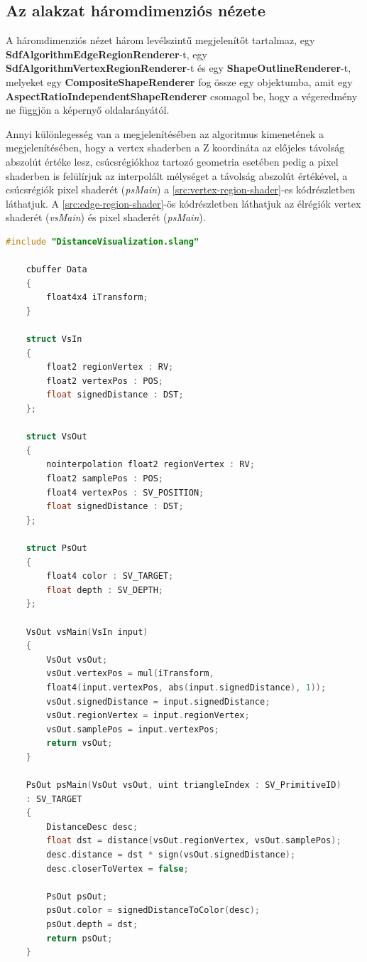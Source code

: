 \subsection{Az alakzat háromdimenziós nézete}

A háromdimenziós nézet három levélszintű megjelenítőt tartalmaz, egy \textbf{SdfAlgorithmEdgeRegionRenderer}-t, egy \textbf{SdfAlgorithmVertexRegionRenderer}-t és egy \textbf{ShapeOutlineRenderer}-t, melyeket egy \textbf{CompositeShapeRenderer} fog össze egy objektumba, amit egy \textbf{AspectRatioIndependentShapeRenderer} csomagol be, hogy a végeredmény ne függjön a képernyő oldalarányától.

Annyi különlegesség van a megjelenítésében az algoritmus kimenetének a megjelenítésében, hogy a vertex shaderben a Z koordináta az előjeles távolság abszolút értéke lesz, csúcsrégiókhoz tartozó geometria esetében pedig a pixel shaderben is felülírjuk az interpolált mélységet a távolság abszolút értékével, a csúcsrégiók pixel shaderét (\textit{psMain}) a \ref{src:vertex-region-shader}-es kódrészletben láthatjuk. A \ref{src:edge-region-shader}-ös kódrészletben láthatjuk az élrégiók vertex shaderét (\textit{vsMain}) és pixel shaderét (\textit{psMain}).

\begin{lstlisting}[language=c]
	#include "DistanceVisualization.slang"

	cbuffer Data
	{
		float4x4 iTransform;
	}

	struct VsIn
	{
		float2 regionVertex : RV;
		float2 vertexPos : POS;
		float signedDistance : DST;
	};

	struct VsOut
	{
		nointerpolation float2 regionVertex : RV;
		float2 samplePos : POS;
		float4 vertexPos : SV_POSITION;
		float signedDistance : DST;
	};

	struct PsOut
	{
		float4 color : SV_TARGET;
		float depth : SV_DEPTH;
	};

	VsOut vsMain(VsIn input)
	{
		VsOut vsOut;
		vsOut.vertexPos = mul(iTransform,
		float4(input.vertexPos, abs(input.signedDistance), 1));
		vsOut.signedDistance = input.signedDistance;
		vsOut.regionVertex = input.regionVertex;
		vsOut.samplePos = input.vertexPos;
		return vsOut;
	}

	PsOut psMain(VsOut vsOut, uint triangleIndex : SV_PrimitiveID)
	: SV_TARGET
	{
		DistanceDesc desc;
		float dst = distance(vsOut.regionVertex, vsOut.samplePos);
		desc.distance = dst * sign(vsOut.signedDistance);
		desc.closerToVertex = false;

		PsOut psOut;
		psOut.color = signedDistanceToColor(desc);
		psOut.depth = dst;
		return psOut;
	}
\end{lstlisting}



